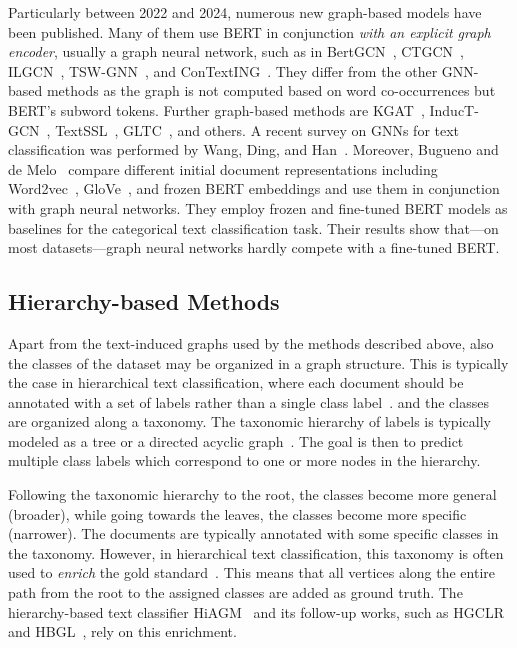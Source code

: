Particularly between 2022 and 2024, numerous new graph-based models have been published.
Many of them use BERT in conjunction \textit{with an explicit graph encoder}, usually a graph neural network, such as in BertGCN~\cite{DBLP:conf/acl/LinMSHKLW21}, CTGCN~\cite{ctgcn}, ILGCN~\cite{ilgcn}, TSW-GNN~\cite{tsw-gnn}, and ConTextING~\cite{DBLP:conf/coling/HuangCC22}.
They differ from the other GNN-based methods as the graph is not computed based on word co-occurrences but BERT's subword tokens.
Further graph-based methods are KGAT~\cite{DBLP:conf/nlpcc/WangWYZSJWZ22}, InducT-GCN~\cite{induct-gcn}, TextSSL~\cite{textssl2022}, GLTC~\cite{gltc2023}, and others.
A recent survey on GNNs for text classification was performed by Wang, Ding, and Han~\cite{wang2023graph}.
Moreover, Bugueno and de Melo~\cite{buguenoConnectingDotsWhat2023} compare different initial document representations including Word2vec~\cite{DBLP:conf/nips/MikolovSCCD13}, GloVe~\cite{DBLP:conf/emnlp/PenningtonSM14}, and frozen BERT embeddings and use them in conjunction with graph neural networks. 
They employ frozen and fine-tuned BERT models as baselines for the categorical text classification task. 
Their results show that---on most datasets---graph neural networks hardly compete with a fine-tuned BERT.

\subsection{Hierarchy-based Methods}
\label{sec:rw:hierarcy-based-methods}
Apart from the text-induced graphs used by the methods described above, also the classes of the dataset may be organized in a graph structure.
This is typically the case in hierarchical text classification, where each document should be annotated with a set of labels rather than a single class label~\cite{DBLP:journals/csur/Sebastiani02}. 
and the classes are organized along a taxonomy. 
The taxonomic hierarchy of labels is typically modeled as a tree or a directed acyclic graph~\cite{shen-etal-2021-taxoclass,hiagm,pengHierarchicalTaxonomyAwareAttentional2021}. 
The goal is then to predict multiple class labels which correspond to one or more nodes in the hierarchy.

Following the taxonomic hierarchy to the root, the classes become more general (broader), while going towards the leaves, the classes become more specific (narrower).
The documents are typically annotated with some specific classes in the taxonomy.
However, in hierarchical text classification, this taxonomy is often used to \emph{enrich} the gold standard~\cite{hiagm}. 
This means that all vertices along the entire path from the root to the assigned classes are added as ground truth.
The hierarchy-based text classifier HiAGM~\cite{hiagm} and its follow-up works, such as HGCLR~\cite{DBLP:conf/acl/WangWH0W22} and HBGL~\cite{hbgl}, rely on this enrichment.

